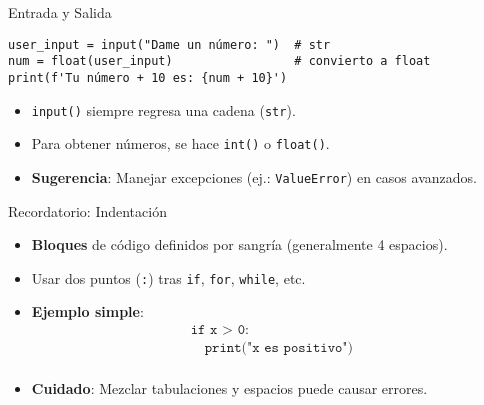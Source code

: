 \documentclass[10pt]{beamer}
\begin{document}
\begin{frame}[fragile]{Entrada y Salida}
\begin{verbatim}
user_input = input("Dame un número: ")  # str
num = float(user_input)                 # convierto a float
print(f'Tu número + 10 es: {num + 10}')
\end{verbatim}
\begin{itemize}
  \item \texttt{input()} siempre regresa una cadena (\texttt{str}).
  \item Para obtener números, se hace \texttt{int()} o \texttt{float()}.
  \item \textbf{Sugerencia}: Manejar excepciones (ej.: \texttt{ValueError}) en casos avanzados.
\end{itemize}
\end{frame}

\begin{frame}{Recordatorio: Indentación}
  \begin{itemize}
    \item \textbf{Bloques} de código definidos por sangría (generalmente 4 espacios).
    \item Usar dos puntos (\texttt{:}) tras \texttt{if}, \texttt{for}, \texttt{while}, etc.
    \item \textbf{Ejemplo simple}:
    \[
      \begin{array}{l}
      \texttt{if x > 0:} \\
      \quad \texttt{print("x es positivo")} \\
      \end{array}
    \]
    \item \textbf{Cuidado}: Mezclar tabulaciones y espacios puede causar errores.
  \end{itemize}
\end{frame}
\end{document}
